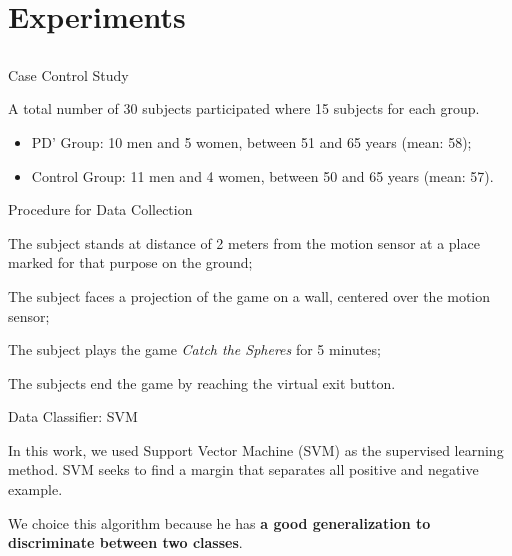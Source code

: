 \documentclass{beamer}
\begin{document}
\section{Experiments}
\subsection{}
\begin{frame}{Case Control Study}
	\begin{block}{}
	A total number of 30 subjects participated where 15 subjects for each group.
		\begin{itemize}
			\item PD' Group: 10 men and 5 women, between 51 and 65 years (mean: 58);
			\item Control Group: 11 men and 4 women, between 50 and 65 years (mean: 57).
		\end{itemize}
	\end{block}
\end{frame}

\begin{frame}{Procedure for Data Collection}
	\begin{block}{}
	\begin{compactenum}
	\item The subject stands at distance of 2 meters from the motion sensor at a place marked for that purpose on the ground;
	\item The subject faces a projection of the game on a wall, centered over the motion sensor;
	\item The subject plays the game \textit{Catch the Spheres} for 5 minutes;
	\item The subjects end the game by reaching the virtual exit button.
\end{compactenum} 
	\end{block}
\end{frame}


\begin{frame}{Data Classifier: SVM}
\begin{block}{}
	In this work, we used Support Vector Machine (SVM) as the supervised learning method. SVM seeks to find a margin that separates all positive and negative example.
		
	We choice this algorithm because he has \textbf{a good generalization to discriminate between two classes}.
\end{block}
\end{frame}
\end{document}

